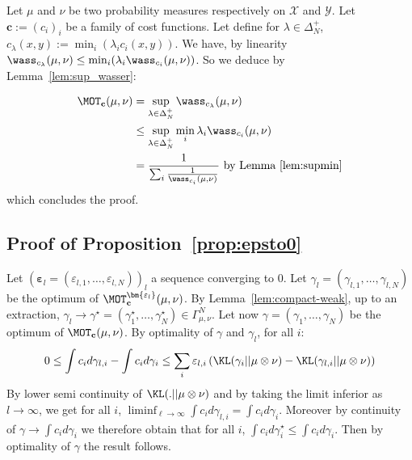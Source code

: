 \begin{prv*}
Let $\mu$ and $\nu$ be two probability measures respectively on $\mathcal{X}$ and $\mathcal{Y}$. Let $\mathbf{c}:=(c_i)_i$ be a family of cost functions. Let define for $\lambda\in\Delta_N^{+}$, $c_\lambda(x,y) := \min_i(\lambda_i c_i(x,y))$. We have, by linearity $\wass_{c_\lambda}(\mu,\nu)\leq \min_i(\lambda_i \wass_{c_i}(\mu,\nu))$. So we deduce by Lemma~\ref{lem:sup_wasser}:

\begin{align*}
    \MOT_{\mathbf{c}}(\mu,\nu)&=\sup_{\lambda\in\Delta_N^{+}} \wass_{c_\lambda}(\mu,\nu)\\
    &\leq\sup_{\lambda\in\Delta_N^{+}} \min_i\lambda_i \wass_{c_i}(\mu,\nu)\\
    &= \frac{1}{\sum_i\frac{1}{\wass_{c_i}(\mu,\nu)}}\text{ by Lemma~\ref{lem:supmin}}\\ 
\end{align*}
which concludes the proof.
\end{prv*}

\subsection{Proof of Proposition~\ref{prop:epsto0}}
\label{prv:epsto0}

\begin{prv*}
Let $(\bm{\varepsilon}_l=(\varepsilon_{l,1},\dots,\varepsilon_{l,N}))_l$ a sequence converging to $0$. Let $\gamma_l = (\gamma_{l,1},\dots,\gamma_{l,N})$ be the optimum of $\MOT^{\bm{\varepsilon_l}}_\mathbf{c}(\mu,\nu)$. By Lemma~\ref{lem:compact-weak}, up to an extraction, $\gamma_l\rightarrow \gamma^\star=(\gamma^\star_{1},\dots,\gamma^\star_{N})\in\Gamma^N_{\mu,\nu}$. Let now $\gamma=(\gamma_{1},\dots,\gamma_{N})$ be the optimum of $\MOT_\mathbf{c}(\mu,\nu)$. By optimality of $\gamma$ and $\gamma_l$, for all $i$: \begin{align*}
    0\leq  \int c_id\gamma_{l,i}-\int c_id\gamma_{i}\leq\sum_i\varepsilon_{l,i}\left(\KL(\gamma_{i}||\mu\otimes\nu)-\KL(\gamma_{l,i}||\mu\otimes\nu)\right)
\end{align*}
By lower semi continuity of $\KL(.||\mu\otimes\nu)$ and by taking the limit inferior as $l\to\infty$, we get for all $i$, $\liminf_{\ell\rightarrow\infty} \int c_id\gamma_{l,i}=\int c_id\gamma_{i}$. Moreover by continuity of $\gamma\rightarrow \int c_i d\gamma_i$  we therefore obtain that for all $i$, $\int c_id\gamma^\star_{i}\leq \int c_id\gamma_{i}$. Then by optimality of $\gamma$ the result follows.
\end{prv*}







